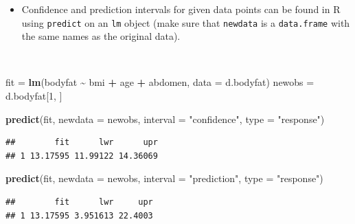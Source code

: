 \documentclass[
  10pt,
  ignorenonframetext,
]{beamer}
\newenvironment{Shaded}{\begin{snugshade}}{\end{snugshade}}
\newcommand{\AttributeTok}[1]{\textcolor[rgb]{0.13,0.29,0.53}{#1}}
\newcommand{\DecValTok}[1]{\textcolor[rgb]{0.00,0.00,0.81}{#1}}
\newcommand{\FunctionTok}[1]{\textcolor[rgb]{0.13,0.29,0.53}{\textbf{#1}}}
\newcommand{\NormalTok}[1]{#1}
\newcommand{\OtherTok}[1]{\textcolor[rgb]{0.56,0.35,0.01}{#1}}
\newcommand{\SpecialCharTok}[1]{\textcolor[rgb]{0.81,0.36,0.00}{\textbf{#1}}}
\newcommand{\StringTok}[1]{\textcolor[rgb]{0.31,0.60,0.02}{#1}}
\providecommand{\tightlist}{%
  \setlength{\itemsep}{0pt}\setlength{\parskip}{0pt}}
\begin{document}
\begin{frame}[fragile]
\begin{itemize}
\tightlist
\item
  Confidence and prediction intervals for given data points can be found
  in R using \texttt{predict} on an \texttt{lm} object (make sure that
  \texttt{newdata} is a \texttt{data.frame} with the same names as the
  original data).
\end{itemize}

\(~\)

\scriptsize

\begin{Shaded}
\begin{Highlighting}[]
\NormalTok{fit }\OtherTok{=} \FunctionTok{lm}\NormalTok{(bodyfat }\SpecialCharTok{\textasciitilde{}}\NormalTok{ bmi }\SpecialCharTok{+}\NormalTok{ age }\SpecialCharTok{+}\NormalTok{ abdomen, }\AttributeTok{data =}\NormalTok{ d.bodyfat)}
\NormalTok{newobs }\OtherTok{=}\NormalTok{ d.bodyfat[}\DecValTok{1}\NormalTok{, ]}
\end{Highlighting}
\end{Shaded}

\begin{Shaded}
\begin{Highlighting}[]
\FunctionTok{predict}\NormalTok{(fit, }\AttributeTok{newdata =}\NormalTok{ newobs, }\AttributeTok{interval =} \StringTok{"confidence"}\NormalTok{, }\AttributeTok{type =} \StringTok{"response"}\NormalTok{)}
\end{Highlighting}
\end{Shaded}

\begin{verbatim}
##        fit      lwr      upr
## 1 13.17595 11.99122 14.36069
\end{verbatim}

\begin{Shaded}
\begin{Highlighting}[]
\FunctionTok{predict}\NormalTok{(fit, }\AttributeTok{newdata =}\NormalTok{ newobs, }\AttributeTok{interval =} \StringTok{"prediction"}\NormalTok{, }\AttributeTok{type =} \StringTok{"response"}\NormalTok{)}
\end{Highlighting}
\end{Shaded}

\begin{verbatim}
##        fit      lwr     upr
## 1 13.17595 3.951613 22.4003
\end{verbatim}
\end{frame}
\end{document}
